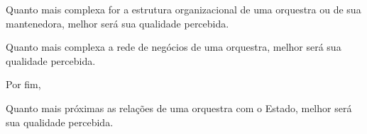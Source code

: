 \documentclass[a4paper, 12pt, openright, oneside, german, french, english, brazil]{abntex2}
\begin{document}
	\begin{hip}\label{hip:estruturacomplexa}
		Quanto mais complexa for a estrutura organizacional de uma orquestra ou de sua mantenedora, melhor será sua qualidade percebida.
	\end{hip}
	
	\begin{hip}\label{hip:redecomplexa}
		Quanto mais complexa a rede de negócios de uma orquestra, melhor será sua qualidade percebida.
	\end{hip}
	
	
	Por fim,
	
	\begin{hip}\label{hip:proxestado}
		Quanto mais próximas as relações de uma orquestra com o Estado, melhor será sua qualidade percebida.
	\end{hip}
\end{document}
